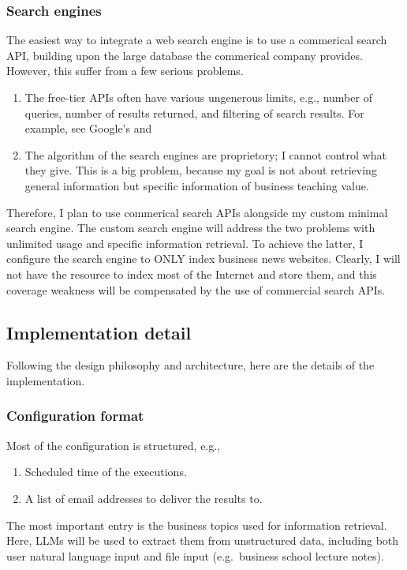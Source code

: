 \documentclass[final-report]{report-template}
\begin{document}
\subsubsection{Search engines} \label{sec.custom.search.engine}
The easiest way to integrate a web search engine is to use a commerical search
API, building upon the large database the commerical company provides.
However, this suffer from a few serious problems.
\begin{enumerate}
	\item 
	The free-tier APIs often have various ungenerous limits, e.g., number of
	queries, number of results returned, and filtering of search results.  For
	example, see Google's \cite{search.api.limit.1} and 
	\item
	The algorithm of the search engines are proprietory; I cannot control what
	they give. This is a big problem, because my goal is not about retrieving
	general information but specific information of business teaching value.
\end{enumerate}

Therefore, I plan to use commerical search APIs alongside my custom minimal
search engine. The custom search engine will address the two problems with
unlimited usage and specific information retrieval. To achieve the latter, I
configure the search engine to ONLY index business news websites. Clearly, I
will not have the resource to index most of the Internet and store them, and
this coverage weakness will be compensated by the use of commercial search
APIs.


\subsection{Implementation detail}
Following the design philosophy and architecture, here are the details of the
implementation.

\subsubsection{Configuration format} 
Most of the configuration is structured, e.g.,
\begin{enumerate}
	\item Scheduled time of the executions.
	\item A list of email addresses to deliver the results to.
\end{enumerate}

The most important entry is the business topics used for information retrieval.
Here, LLMs will be used to extract them from unstructured data, including
both user natural language input and file input (e.g.\ business school lecture
notes).
\end{document}
